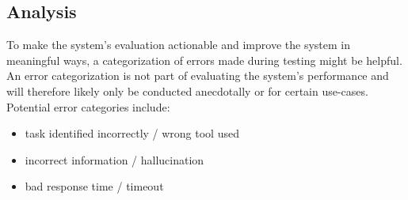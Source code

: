 \documentclass{article}
\begin{document}
\subsection{Analysis}
To make the system's evaluation actionable and improve the system in meaningful ways, a categorization of errors made during testing might be helpful. An error categorization is not part of evaluating the system's performance and will therefore likely only be conducted anecdotally or for certain use-cases. Potential error categories include:
\begin{itemize}
    \item task identified incorrectly / wrong tool used
    \item incorrect information / hallucination
    \item bad response time / timeout
\end{itemize}
\end{document}
